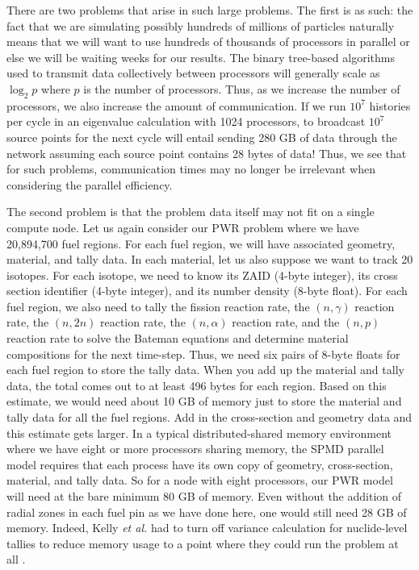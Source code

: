 \documentclass[11pt]{article}
\begin{document}
There are two problems that arise in such large problems. The first is
as such: the fact that we are simulating possibly hundreds of millions
of particles naturally means that we will want to use hundreds of
thousands of processors in parallel or else we will be waiting weeks
for our results. The binary tree-based algorithms used to transmit
data collectively between processors will generally scale as $\log_2
p$ where $p$ is the number of processors. Thus, as we increase the
number of processors, we also increase the amount of communication. If
we run $10^7$ histories per cycle in an eigenvalue calculation with
1024 processors, to broadcast $10^7$ source points for the next cycle
will entail sending 280 GB of data through the network assuming each
source point contains 28 bytes of data! Thus, we see that for such
problems, communication times may no longer be irrelevant when
considering the parallel efficiency.

The second problem is that the problem data itself may not fit on a
single compute node. Let us again consider our PWR problem where we
have 20,894,700 fuel regions. For each fuel region, we will have
associated geometry, material, and tally data. In each material, let
us also suppose we want to track 20 isotopes. For each isotope, we
need to know its ZAID (4-byte integer), its cross section identifier
(4-byte integer), and its number density (8-byte float). For each fuel
region, we also need to tally the fission reaction rate, the
$(n,\gamma)$ reaction rate, the $(n,2n)$ reaction rate, the
$(n,\alpha)$ reaction rate, and the $(n,p)$ reaction rate to solve the
Bateman equations and determine material compositions for the next
time-step. Thus, we need six pairs of 8-byte floats for each fuel
region to store the tally data. When you add up the material and tally
data, the total comes out to at least 496 bytes for each region. Based
on this estimate, we would need about 10 GB of memory just to store
the material and tally data for all the fuel regions. Add in the
cross-section and geometry data and this estimate gets larger. In a
typical distributed-shared memory environment where we have eight or
more processors sharing memory, the SPMD parallel model requires that
each process have its own copy of geometry, cross-section, material,
and tally data. So for a node with eight processors, our PWR model
will need at the bare minimum 80 GB of memory. Even without the
addition of radial zones in each fuel pin as we have done here, one
would still need 28 GB of memory. Indeed, Kelly {\em et al.} had to
turn off variance calculation for nuclide-level tallies to reduce
memory usage to a point where they could run the problem at all
\cite{kelly}.
\end{document}
